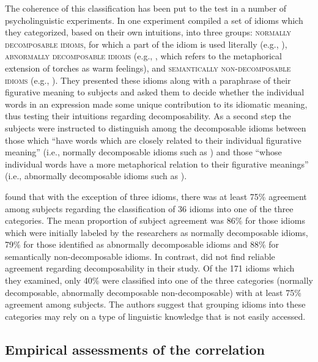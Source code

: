 \documentclass[output=paper]{langsci/langscibook}
\begin{document}
The coherence of this classification has been put to the
test in a number of psycholinguistic experiments.
In one experiment \citet{gibbs89} compiled a set of idioms which they categorized, based on their own intuitions, into three groups: {\scshape normally decomposable idioms}, for which a part of the idiom is used literally (e.g., ),  {\scshape abnormally decomposable idioms}  (e.g., , which refers to the metaphorical extension of torches as warm feelings), and {\scshape semantically non-de\-com\-pos\-able idioms} (e.g., ). They presented these idioms along with a paraphrase of their figurative meaning to subjects and asked them to decide whether the individual words in an expression made some unique contribution to its idiomatic meaning, thus testing their intuitions regarding decomposability. As a second step the subjects were instructed to distinguish among the decomposable idioms between those which ``have words which are closely related to their individual figurative meaning'' (i.e., normally decomposable idioms such as ) and those ``whose individual words have a more metaphorical relation to their figurative meanings'' (i.e., abnormally decomposable idioms such as ).

\citet{gibbs89} found that with the exception of three idioms, there was at least 75\% agreement among subjects regarding the classification of 36 idioms into one of the three categories.
The mean proportion of subject agreement was 86\% for those idioms which were initially labeled by the researchers as normally decomposable idioms, 79\% for those identified as abnormally decomposable idioms and 88\% for semantically non-de\-com\-pos\-able idioms.
In contrast, \citet{titoneconnine94} did not find reliable agreement regarding
decomposability in their study. Of the 171 idioms which they examined, only 40\% were classified into one of the three categories (normally decomposable, abnormally decomposable non-decomposable) with at least 75\% agreement among subjects. The authors suggest that grouping idioms into these categories may rely on a type of linguistic knowledge that is not easily accessed.


\subsection{Empirical assessments of the correlation}
\end{document}
